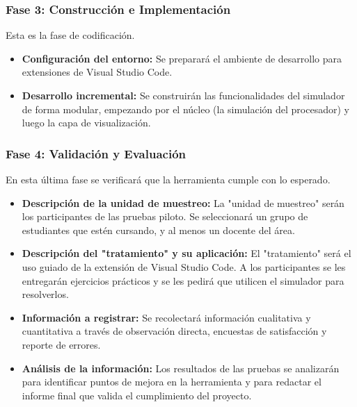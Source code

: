 \documentclass[12pt, letterpaper]{article}
\begin{document}
\subsubsection{Fase 3: Construcción e Implementación}
Esta es la fase de codificación.
\begin{itemize}
    \item \textbf{Configuración del entorno:} Se preparará el ambiente de desarrollo para extensiones de Visual Studio Code.
    \item \textbf{Desarrollo incremental:} Se construirán las funcionalidades del simulador de forma modular, empezando por el núcleo (la simulación del procesador) y luego la capa de visualización.
\end{itemize}

\subsubsection{Fase 4: Validación y Evaluación}
En esta última fase se verificará que la herramienta cumple con lo esperado.
\begin{itemize}
    \item \textbf{Descripción de la unidad de muestreo:} La "unidad de muestreo" serán los participantes de las pruebas piloto. Se seleccionará un grupo de estudiantes que estén cursando, y al menos un docente del área.
    \item \textbf{Descripción del "tratamiento" y su aplicación:} El "tratamiento" será el uso guiado de la extensión de Visual Studio Code. A los participantes se les entregarán ejercicios prácticos y se les pedirá que utilicen el simulador para resolverlos.
    \item \textbf{Información a registrar:} Se recolectará información cualitativa y cuantitativa a través de observación directa, encuestas de satisfacción y reporte de errores.
    \item \textbf{Análisis de la información:} Los resultados de las pruebas se analizarán para identificar puntos de mejora en la herramienta y para redactar el informe final que valida el cumplimiento del proyecto.
\end{itemize}
\end{document}
